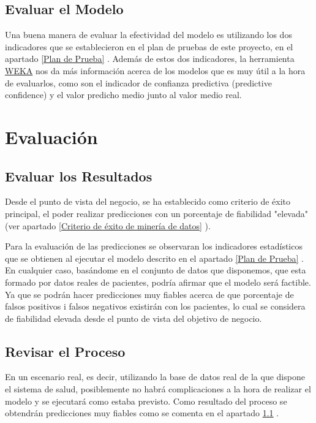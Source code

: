 \documentclass{article}
\begin{document}
\subsection{Evaluar el Modelo}
Una buena manera de evaluar la efectividad del modelo es utilizando los dos indicadores que se establecieron en el plan de pruebas de este proyecto, en el apartado \ref{Plan de Prueba} . Además de estos dos indicadores, la herramienta \href{https://www.cs.waikato.ac.nz/~ml/weka/}{WEKA} nos da más información acerca de los modelos que es muy útil a la hora de evaluarlos, como son el indicador de confianza predictiva (predictive confidence) y el valor predicho medio junto al valor medio real.

\section{Evaluación}

\subsection{Evaluar los Resultados}\label{Evaluar los Resultados}
Desde el punto de vista del negocio, se ha establecido como criterio de éxito principal, el poder realizar predicciones con un porcentaje de fiabilidad "elevada" (ver apartado \ref{Criterio de éxito de minería de datos} ).

Para la evaluación de las predicciones se observaran los indicadores estadísticos que se obtienen al ejecutar el modelo descrito en el apartado \ref{Plan de Prueba} . En cualquier caso, basándome en el conjunto de datos que disponemos, que esta formado por datos reales de pacientes, podría afirmar que el modelo será factible. Ya que se podrán hacer predicciones muy fiables acerca de que porcentaje de falsos positivos i falsos negativos existirán con los pacientes, lo cual se considera de fiabilidad elevada desde el punto de vista del objetivo de negocio.

\subsection{Revisar el Proceso}
En un escenario real, es decir, utilizando la base de datos real de la que dispone el sistema de salud, posiblemente no habrá complicaciones a la hora de realizar el modelo y se ejecutará como estaba previsto. Como resultado del proceso se obtendrán predicciones muy fiables como se comenta en el apartado \ref{Evaluar los Resultados} .
\end{document}
